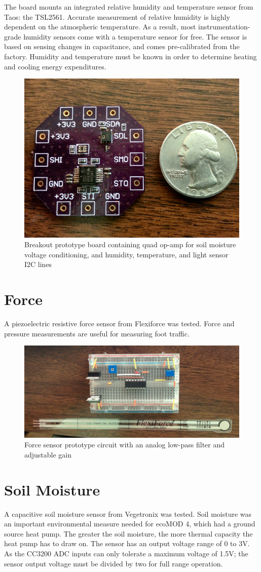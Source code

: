 The board mounts an integrated relative humidity and temperature sensor from Taos: the TSL2561. Accurate measurement of relative humidity is highly dependent on the atmospheric temperature. As a result, most instrumentation-grade humidity sensors come with a temperature sensor for free. The sensor is based on sensing changes in capacitance, and comes pre-calibrated from the factory. Humidity and temperature must be known in order to determine heating and cooling energy expenditures.

\begin{figure}[h]
\centering
\includegraphics[width=0.3\linewidth]{images/sbrk-proto}
\caption[Development breakout]{Breakout prototype board containing quad op-amp for soil moisture voltage conditioning, and humidity, temperature, and light sensor I2C lines}
\label{fig:sbrk-proto}
\end{figure}

\section{Force}
    
A piezoelectric resistive force sensor from Flexiforce was tested. Force and pressure measurements are useful for measuring foot traffic. 

\begin{figure}[h]
\centering
\includegraphics[width=0.33\linewidth]{images/force-proto}
\caption[Force sensor prototype]{Force sensor prototype circuit with an analog low-pass filter and adjustable gain}
\label{fig:force-proto}
\end{figure}

\section{Soil Moisture}

A capacitive soil moisture sensor from Vegetronix was tested. Soil moisture was an important environmental measure needed for ecoMOD 4, which had a ground source heat pump. The greater the soil moisture, the more thermal capacity the heat pump has to draw on. The sensor has an output voltage range of 0 to 3V. As the CC3200 ADC inputs can only tolerate a maximum voltage of 1.5V; the sensor output voltage must be divided by two for full range operation.

